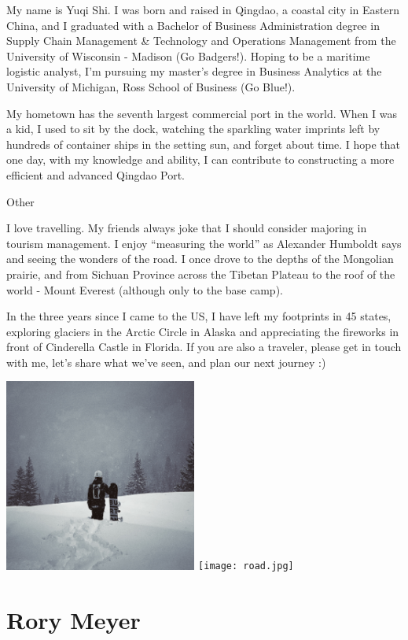 \documentclass[
]{book}
\begin{document}
My name is Yuqi Shi. I was born and raised in Qingdao, a coastal city in Eastern China, and I graduated with a Bachelor of Business Administration degree in Supply Chain Management \& Technology and Operations Management from the University of Wisconsin - Madison (Go Badgers!). Hoping to be a maritime logistic analyst, I'm pursuing my master's degree in Business Analytics at the University of Michigan, Ross School of Business (Go Blue!).

My hometown has the seventh largest commercial port in the world. When I was a kid, I used to sit by the dock, watching the sparkling water imprints left by hundreds of container ships in the setting sun, and forget about time. I hope that one day, with my knowledge and ability, I can contribute to constructing a more efficient and advanced Qingdao Port.

Other

I love travelling. My friends always joke that I should consider majoring in tourism management. I enjoy ``measuring the world'' as Alexander Humboldt says and seeing the wonders of the road. I once drove to the depths of the Mongolian prairie, and from Sichuan Province across the Tibetan Plateau to the roof of the world - Mount Everest (although only to the base camp).

In the three years since I came to the US, I have left my footprints in 45 states, exploring glaciers in the Arctic Circle in Alaska and appreciating the fireworks in front of Cinderella Castle in Florida. If you are also a traveler, please get in touch with me, let's share what we've seen, and plan our next journey :)

\includegraphics[width=0.475\textwidth,height=\textheight]{sb1.jpeg} \texttt{[image: road.jpg]}

\hypertarget{rory-meyer}{%
\section{Rory Meyer}\label{rory-meyer}}
\end{document}
